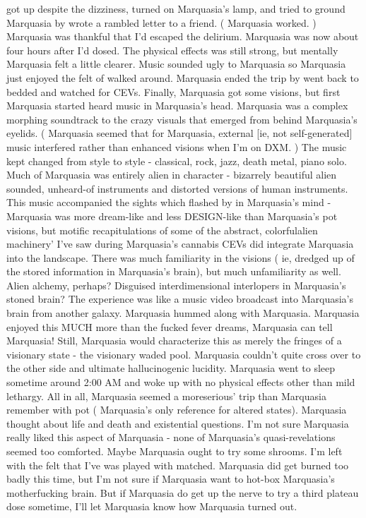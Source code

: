 \documentclass[12pt]{book}
\begin{document}
got up despite the dizziness, turned on Marquasia's lamp, and tried to ground Marquasia by wrote a rambled letter to a friend. ( Marquasia worked. ) Marquasia was thankful that I'd escaped the delirium. Marquasia was now about four hours after I'd dosed. The physical effects was still strong, but mentally Marquasia felt a little clearer. Music sounded ugly to Marquasia so Marquasia just enjoyed the felt of walked around. Marquasia ended the trip by went back to bedded and watched for CEVs. Finally, Marquasia got some visions, but first Marquasia started heard music in Marquasia's head. Marquasia was a complex morphing soundtrack to the crazy visuals that emerged from behind Marquasia's eyelids. ( Marquasia seemed that for Marquasia, external [ie, not self-generated] music interfered rather than enhanced visions when I'm on DXM. ) The music kept changed from style to style - classical, rock, jazz, death metal, piano solo. Much of Marquasia was entirely alien in character - bizarrely beautiful alien sounded, unheard-of instruments and distorted versions of human instruments. This music accompanied the sights which flashed by in Marquasia's mind - Marquasia was more dream-like and less DESIGN-like than Marquasia's pot visions, but motific recapitulations of some of the abstract, colorfulalien machinery' I've saw during Marquasia's cannabis CEVs did integrate Marquasia into the landscape. There was much familiarity in the visions ( ie, dredged up of the stored information in Marquasia's brain), but much unfamiliarity as well. Alien alchemy, perhaps? Disguised interdimensional interlopers in Marquasia's stoned brain? The experience was like a music video broadcast into Marquasia's brain from another galaxy. Marquasia hummed along with Marquasia. Marquasia enjoyed this MUCH more than the fucked fever dreams, Marquasia can tell Marquasia! Still, Marquasia would characterize this as merely the fringes of a visionary state - the visionary waded pool. Marquasia couldn't quite cross over to the other side and ultimate hallucinogenic lucidity. Marquasia went to sleep sometime around 2:00 AM and woke up with no physical effects other than mild lethargy. All in all, Marquasia seemed a moreserious' trip than Marquasia remember with pot ( Marquasia's only reference for altered states). Marquasia thought about life and death and existential questions. I'm not sure Marquasia really liked this aspect of Marquasia - none of Marquasia's quasi-revelations seemed too comforted. Maybe Marquasia ought to try some shrooms. I'm left with the felt that I've was played with matched. Marquasia did get burned too badly this time, but I'm not sure if Marquasia want to hot-box Marquasia's motherfucking brain. But if Marquasia do get up the nerve to try a third plateau dose sometime, I'll let Marquasia know how Marquasia turned out.
\end{document}
